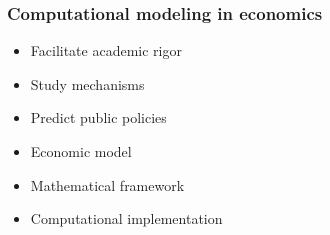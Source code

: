 \begin{frame}\frametitle{Computational modeling in economics}

	\begin{multicols}{2}
	\vspace{0.3cm}
	\begin{itemize}\setlength\itemsep{1em}
	\item Facilitate academic rigor
	\item Study mechanisms
	\item Predict public policies
	\end{itemize}

	\pause

  \vspace{0.3cm}
	\begin{itemize}\setlength\itemsep{1em}
	\item Economic model
	\item Mathematical framework
	\item Computational implementation
	\end{itemize}
	\end{multicols}

\end{frame}
